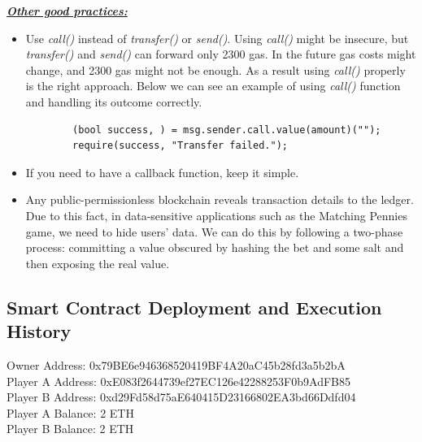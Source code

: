 \documentclass[12pt,a4paper]{article}
\begin{document}
\textbf{\emph{\underline{Other good practices:}}} \\ 

\begin{itemize}
    \item Use \emph{call()} instead of \emph{transfer()} or \emph{send()}.
    Using \emph{call()}  might be insecure, but \emph{transfer()} and \emph{send()} can forward only 2300 gas. In the future 
    gas costs might change, and 2300 gas might not be enough. As a result using \emph{call()} properly is the right approach.
    Below we can see an example of using \emph{call()} function and handling its outcome correctly.\\
    \begin{lstlisting}
        (bool success, ) = msg.sender.call.value(amount)(""); 
        require(success, "Transfer failed.");
    \end{lstlisting}
    \item If you need to have a callback function, keep it simple.
    \item Any public-permissionless blockchain reveals transaction details to 
    the ledger. Due to this fact, in data-sensitive applications such as the
    Matching Pennies game, we need to hide users' data. We can do this by following a
    two-phase process: committing a value obscured by hashing the bet and some salt
    and then exposing the real value.
\end{itemize}

\subsection*{Smart Contract Deployment and Execution History}

Owner Address: 0x79BE6e946368520419BF4A20aC45b28fd3a5b2bA \\
Player A Address: 0xE083f2644739ef27EC126e42288253F0b9AdFB85 \\
Player B Address: 0xd29Fd58d75aE640415D23166802EA3bd66Ddfd04 \\

Player A Balance: 2 ETH \\
Player B Balance: 2 ETH \\
\end{document}
